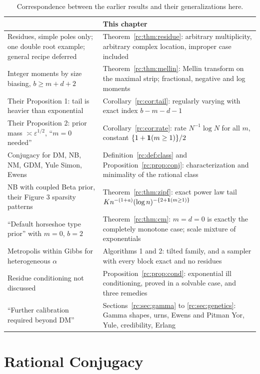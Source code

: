 \begin{table}[htbp]
\centering\small
\begin{tabular}{@{}>{\raggedright\arraybackslash}p{1.75in}>{\raggedright\arraybackslash}p{2.6in}@{}}
\toprule
\citet{rc:wang2024} & This chapter\\
\midrule
Residues, simple poles only; one double root example; general recipe deferred & Theorem~\ref{rc:thm:residue}: arbitrary multiplicity, arbitrary complex location, improper case included\\
Integer moments by size biasing, $b\ge m+d+2$ & Theorem~\ref{rc:thm:mellin}: Mellin transform on the maximal strip; fractional, negative and log moments\\
Their Proposition 1: tail is heavier than exponential & Corollary~\ref{rc:cor:tail}: regularly varying with exact index $b-m-d-1$\\
Their Proposition 2: prior mass $\asymp\varepsilon^{1/2}$, ``$m=0$ needed'' & Corollary~\ref{rc:cor:rate}: rate $N^{-1}\log N$ for all $m$, constant $\{1+\mathbf{1}(m\ge1)\}/2$\\
Conjugacy for DM, NB, NM, GDM, Yule Simon, Ewens & Definition~\ref{rc:def:class} and Proposition~\ref{rc:prop:conj}: characterization and minimality of the rational class\\
NB with coupled Beta prior, their Figure 3 sparsity patterns & Theorem~\ref{rc:thm:zipf}: exact power law tail $Kn^{-(1+a)}(\log n)^{-\{2+\mathbf{1}(m\ge1)\}}$\\
``Default horseshoe type prior'' with $m=0$, $b=2$ & Theorem~\ref{rc:thm:cm}: $m=d=0$ is exactly the completely monotone case; scale mixture of exponentials\\
Metropolis within Gibbs for heterogeneous $\alpha$ & Algorithms 1 and 2: tilted family, and a sampler with every block exact and no residues\\
Residue conditioning not discussed & Proposition~\ref{rc:prop:cond}: exponential ill conditioning, proved in a solvable case, and three remedies\\
``Further calibration required beyond DM'' & Sections~\ref{rc:sec:gamma} to \ref{rc:sec:genetics}: Gamma shapes, urns, Ewens and Pitman Yor, Yule, credibility, Erlang\\
\bottomrule
\end{tabular}
\caption{Correspondence between the earlier results and their generalizations here.}\label{rc:tab:map}
\end{table}

\section{Rational Conjugacy}\label{rc:sec:rational}

